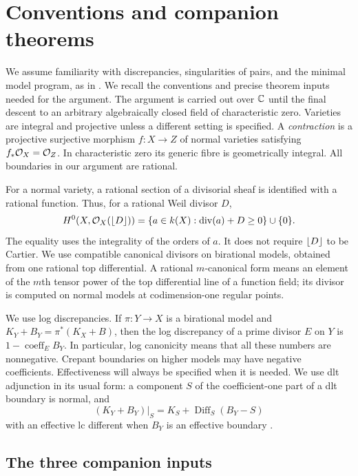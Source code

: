 \section{Conventions and companion theorems}\label{sec:preliminaries}

We assume familiarity with discrepancies, singularities of pairs, and
the minimal model program, as in \cite{KM,KollarSing}. We recall the
conventions and precise theorem inputs needed for the argument.
The argument is carried out over $\mathbb C$ until the final descent to an
arbitrary algebraically closed field of characteristic zero. Varieties
are integral and projective unless a different setting is specified.
A \emph{contraction} is a projective surjective morphism
$f:X\to Z$ of normal varieties satisfying $f_*\mathcal O_X=\mathcal O_Z$.
In characteristic zero its generic fibre is geometrically integral.
All boundaries in our argument are rational.

For a normal variety, a rational section of a divisorial sheaf is
identified with a rational function. Thus, for a rational Weil divisor $D$,
\begin{equation}\label{eq:section-inequality}
 H^0(X,\mathcal O_X(\left\lfloor D\right\rfloor))
 =\{a\in k(X):\operatorname{div}(a)+D\geq0\}\cup\{0\}.
\end{equation}
The equality uses the integrality of the orders of $a$. It does not
require $\left\lfloor D\right\rfloor$ to be Cartier. We use compatible canonical divisors
on birational models, obtained from one rational top differential.
A rational $m$-canonical form means an element of the $m$th tensor power
of the top differential line of a function field; its divisor is computed
on normal models at codimension-one regular points.

We use log discrepancies. If $\pi:Y\to X$ is a birational model and
$K_Y+B_Y=\pi^*(K_X+B)$, then the log discrepancy of a prime divisor $E$
on $Y$ is $1-\operatorname{coeff}_E B_Y$. In particular, log canonicity
means that all these numbers are nonnegative. Crepant boundaries on
higher models may have negative coefficients. Effectiveness will always
be specified when it is needed. We use dlt adjunction in its usual form:
a component $S$ of the coefficient-one part of a dlt boundary is normal,
and
\[
 (K_Y+B_Y)|_S=K_S+\operatorname{Diff}_S(B_Y-S)
\]
with an effective lc different when $B_Y$ is an effective boundary
\cite{KM,KollarSing}.

\subsection{The three companion inputs}

